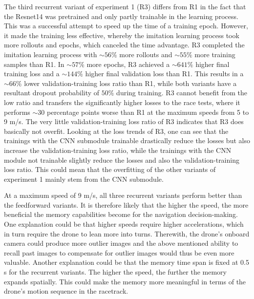 The third recurrent variant of experiment 1 (R3)
differs from R1 in the fact that 
the Resnet14 was pretrained 
and only partly trainable in the learning process.
This was a successful attempt to speed up the time of a training epoch.
However, it made the training less effective,
whereby the imitation learning process took more rollouts and epochs,
which canceled the time advantage.
R3 completed the imitation learning process with $\sim 56\%$ more rollouts
and $\sim 55\%$ more training samples than R1.
In $\sim 57\%$ more epochs,
R3 achieved a $\sim 641\%$ higher final training loss
and a $\sim 144\%$ higher final validation loss than R1.
This results in a $\sim 66\%$ lower validation-training loss ratio 
than R1, 
while both variants have a resultant dropout probability of $50\%$ during training.
R3 cannot benefit from the low ratio and transfers the significantly higher losses to the race tests,
where it performs $\sim 30$ percentage points worse than R1 at the maximum speeds from 5 to 9 m/s.
The very little validation-training loss ratio of R3 
indicates that R3 does basically not overfit.
Looking at the loss trends of R3,
one can see that the trainings with the CNN submodule trainable
drastically reduce the losses but also increase the validation-training loss ratio,
while the trainings with the CNN module not trainable
slightly reduce the losses and also the validation-training loss ratio.
This could mean that the overfitting of the other variants of experiment 1
mainly stem from the CNN submodule.


At a maximum speed of 9 m/s, all three recurrent variants perform better than the feedforward variants.
It is therefore likely that the higher the speed, the more beneficial the memory capabilities become for
the navigation decision-making.
One explanation could be that higher speeds require higher accelerations,
which in turn require the drone to lean more into turns.
Therewith, the drone's onboard camera could produce more outlier images
and the above mentioned ability to recall past images 
to compensate for outlier images would thus be even more valuable.
Another explanation could be that the memory time span is fixed at 0.5 s for the recurrent variants.
The higher the speed, the further the memory expands spatially.
This could make the memory more meaningful in terms of the drone's motion sequence in the racetrack.



